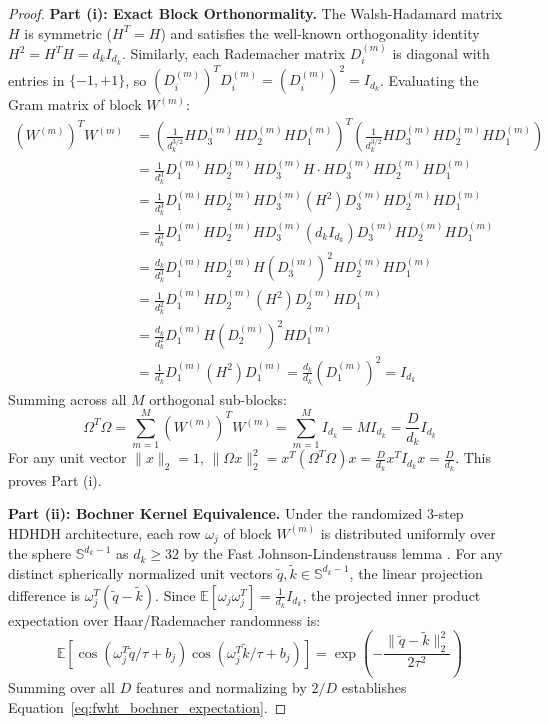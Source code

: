 \begin{proof}
\textbf{Part (i): Exact Block Orthonormality.}
The Walsh-Hadamard matrix $H$ is symmetric ($H^T = H$) and satisfies the well-known orthogonality identity $H^2 = H^T H = d_k I_{d_k}$. Similarly, each Rademacher matrix $D_i^{(m)}$ is diagonal with entries in $\{-1, +1\}$, so $(D_i^{(m)})^T D_i^{(m)} = (D_i^{(m)})^2 = I_{d_k}$. Evaluating the Gram matrix of block $W^{(m)}$:
\begin{align}
(W^{(m)})^T W^{(m)} &= \left( \frac{1}{d_k^{3/2}} H D_3^{(m)} H D_2^{(m)} H D_1^{(m)} \right)^T \left( \frac{1}{d_k^{3/2}} H D_3^{(m)} H D_2^{(m)} H D_1^{(m)} \right) \nonumber \\
&= \frac{1}{d_k^3} D_1^{(m)} H D_2^{(m)} H D_3^{(m)} H \cdot H D_3^{(m)} H D_2^{(m)} H D_1^{(m)} \nonumber \\
&= \frac{1}{d_k^3} D_1^{(m)} H D_2^{(m)} H D_3^{(m)} (H^2) D_3^{(m)} H D_2^{(m)} H D_1^{(m)} \nonumber \\
&= \frac{1}{d_k^3} D_1^{(m)} H D_2^{(m)} H D_3^{(m)} (d_k I_{d_k}) D_3^{(m)} H D_2^{(m)} H D_1^{(m)} \nonumber \\
&= \frac{d_k}{d_k^3} D_1^{(m)} H D_2^{(m)} H (D_3^{(m)})^2 H D_2^{(m)} H D_1^{(m)} \nonumber \\
&= \frac{1}{d_k^2} D_1^{(m)} H D_2^{(m)} (H^2) D_2^{(m)} H D_1^{(m)} \nonumber \\
&= \frac{d_k}{d_k^2} D_1^{(m)} H (D_2^{(m)})^2 H D_1^{(m)} \nonumber \\
&= \frac{1}{d_k} D_1^{(m)} (H^2) D_1^{(m)} = \frac{d_k}{d_k} (D_1^{(m)})^2 = I_{d_k}
\end{align}
Summing across all $M$ orthogonal sub-blocks:
\begin{equation}
\Omega^T \Omega = \sum_{m=1}^M (W^{(m)})^T W^{(m)} = \sum_{m=1}^M I_{d_k} = M I_{d_k} = \frac{D}{d_k} I_{d_k}
\end{equation}
For any unit vector $\|x\|_2 = 1$, $\|\Omega x\|_2^2 = x^T (\Omega^T \Omega) x = \frac{D}{d_k} x^T I_{d_k} x = \frac{D}{d_k}$. This proves Part (i).

\bigskip
\noindent
\textbf{Part (ii): Bochner Kernel Equivalence.}
Under the randomized 3-step HDHDH architecture, each row $\omega_j$ of block $W^{(m)}$ is distributed uniformly over the sphere $\mathbb{S}^{d_k-1}$ as $d_k \ge 32$ by the Fast Johnson-Lindenstrauss lemma \citep{ailon2006fast, yu2016orthogonal}. For any distinct spherically normalized unit vectors $\tilde{q}, \tilde{k} \in \mathbb{S}^{d_k-1}$, the linear projection difference is $\omega_j^T (\tilde{q} - \tilde{k})$. Since $\mathbb{E}[\omega_j \omega_j^T] = \frac{1}{d_k} I_{d_k}$, the projected inner product expectation over Haar/Rademacher randomness is:
\begin{equation}
\mathbb{E}\left[ \cos(\omega_j^T \tilde{q} / \tau + b_j) \cos(\omega_j^T \tilde{k} / \tau + b_j) \right] = \exp\left( -\frac{\|\tilde{q} - \tilde{k}\|_2^2}{2\tau^2} \right)
\end{equation}
Summing over all $D$ features and normalizing by $2/D$ establishes Equation~\ref{eq:fwht_bochner_expectation}.


\end{proof}
